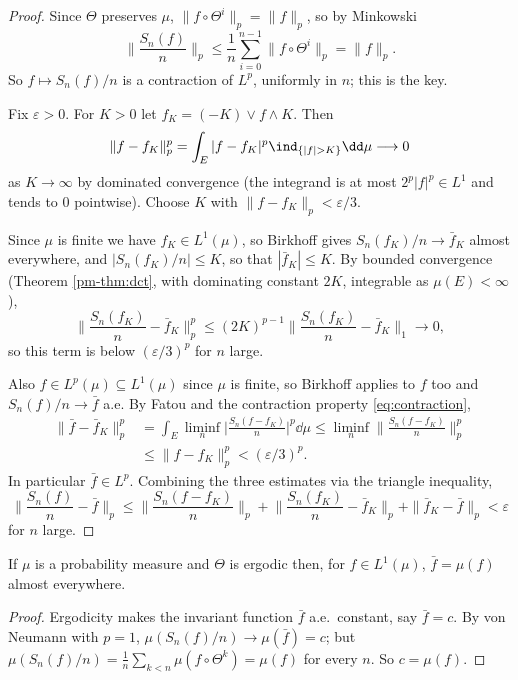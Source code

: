 \begin{proof}
	Since $\Theta$ preserves $\mu$, $\|f\circ\Theta^i\|_p = \|f\|_p$, so by Minkowski
	\begin{equation}\label{eq:contraction}
		\Big\|\frac{S_n(f)}{n}\Big\|_p \leq \frac1n\sum_{i=0}^{n-1}\|f\circ\Theta^i\|_p = \|f\|_p. \tag{$\sharp$}
	\end{equation}
	So $f \mapsto S_n(f)/n$ is a contraction of $L^p$, uniformly in $n$; this is the key.

	Fix $\varepsilon>0$. For $K>0$ let $f_K = (-K)\vee f\wedge K$. Then
	$$
	\|f-f_K\|_p^p = \int_E |f-f_K|^p\ind_{\{|f|>K\}}\dd\mu \longrightarrow 0
	$$
	as $K \to\infty$ by dominated convergence (the integrand is at most $2^p|f|^p \in L^1$ and tends to $0$ pointwise). Choose $K$ with $\|f-f_K\|_p<\varepsilon/3$.

	Since $\mu$ is finite we have $f_K \in L^1(\mu)$, so Birkhoff gives $S_n(f_K)/n \to \bar f_K$ almost everywhere, and $|S_n(f_K)/n|\leq K$, so that $|\bar f_K|\leq K$. By bounded convergence (Theorem \ref{pm-thm:dct}, with dominating constant $2K$, integrable as $\mu(E)<\infty$),
	$$
	\Big\|\frac{S_n(f_K)}{n}-\bar f_K\Big\|_p^p \leq (2K)^{p-1}\Big\|\frac{S_n(f_K)}{n}-\bar f_K\Big\|_1 \longrightarrow 0,
	$$
	so this term is below $(\varepsilon/3)^p$ for $n$ large.

	Also $f \in L^p(\mu)\subseteq L^1(\mu)$ since $\mu$ is finite, so Birkhoff applies to $f$ too and $S_n(f)/n \to \bar f$ a.e. By Fatou and the contraction property \eqref{eq:contraction},
	\begin{align*}
		\|\bar f - \bar f_K\|_p^p &= \int_E \liminf_n \Big|\frac{S_n(f-f_K)}{n}\Big|^p\dd\mu \leq \liminf_n \Big\|\frac{S_n(f-f_K)}{n}\Big\|_p^p\\
		&\leq \|f-f_K\|_p^p<(\varepsilon/3)^p.
	\end{align*}
	In particular $\bar f \in L^p$. Combining the three estimates via the triangle inequality,
	$$
	\Big\|\frac{S_n(f)}{n}-\bar f\Big\|_p \leq \Big\|\frac{S_n(f-f_K)}{n}\Big\|_p + \Big\|\frac{S_n(f_K)}{n}-\bar f_K\Big\|_p+\|\bar f_K-\bar f\|_p<\varepsilon
	$$
	for $n$ large.
\end{proof}

\begin{corollary}\label{cor:mean-identified}
	If $\mu$ is a probability measure and $\Theta$ is ergodic then, for $f \in L^1(\mu)$, $\bar f = \mu(f)$ almost everywhere.
\end{corollary}
\begin{proof}
	Ergodicity makes the invariant function $\bar f$ a.e.\ constant, say $\bar f = c$. By von Neumann with $p=1$, $\mu(S_n(f)/n)\to\mu(\bar f)=c$; but $\mu(S_n(f)/n)=\frac1n\sum_{k<n}\mu(f\circ\Theta^k)=\mu(f)$ for every $n$. So $c = \mu(f)$.
\end{proof}

